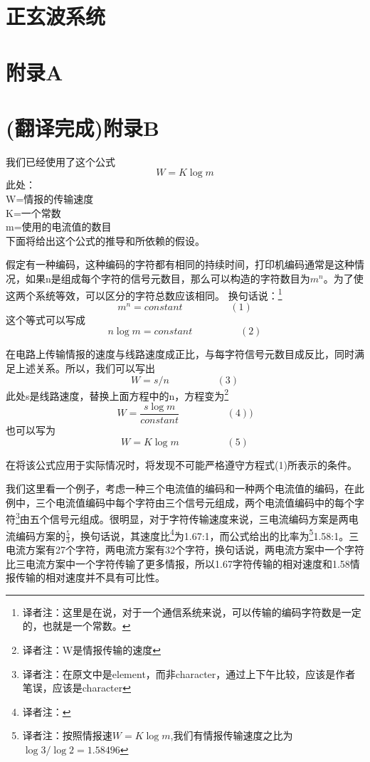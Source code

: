\documentclass{hfutpaper}
\begin{document}
\section{正玄波系统}

\appendix

\section{附录A}

\section{(翻译完成)附录B}
我们已经使用了这个公式
\[W=K \log{m} \]
此处：\\
W=情报的传输速度\\
K=一个常数\\
m=使用的电流值的数目\\

下面将给出这个公式的推导和所依赖的假设。
\par

假定有一种编码，这种编码的字符都有相同的持续时间，打印机编码通常是这种情况，如果n是组成每个字符的信号元数目，那么可以构造的字符数目为$m^n$。为了使这两个系统等效，可以区分的字符总数应该相同。 换句话说：\footnote{译者注：这里是在说，对于一个通信系统来说，可以传输的编码字符数是一定的，也就是一个常数。}
\[m^n=constant  \hspace{2cm}(1)\]
这个等式可以写成
\[n\log{m}=constant \hspace{2cm}(2)\]

在电路上传输情报的速度与线路速度成正比，与每字符信号元数目成反比，同时满足上述关系。所以，我们可以写出
\[W=s/n  \hspace{2cm}(3)\]
此处s是线路速度，替换上面方程中的n，方程变为\footnote{译者注：W是情报传输的速度}
\[W=\frac{s\log{m}}{constant}  \hspace{2cm}(4))\]
也可以写为
\[W=K\log{m}  \hspace{2cm}(5)\]
\par
在将该公式应用于实际情况时，将发现不可能严格遵守方程式(1)所表示的条件。\par
我们这里看一个例子，考虑一种三个电流值的编码和一种两个电流值的编码，在此例中，三个电流值编码中每个字符由三个信号元组成，两个电流值编码中的每个字符\footnote{译者注：在原文中是element，而非character，通过上下午比较，应该是作者笔误，应该是character}由五个信号元组成。很明显，对于字符传输速度来说，三电流编码方案是两电流编码方案的$\frac{5}{3}$，换句话说，其速度比\footnote{译者注：}为1.67:1，而公式给出的比率为\footnote{译者注：按照情报速$W=K\log{m}$,我们有情报传输速度之比为$\log{3}/\log{2}=1.58496$}1.58:1。三电流方案有27个字符，两电流方案有32个字符，换句话说，两电流方案中一个字符比三电流方案中一个字符传输了更多情报，所以1.67字符传输的相对速度和1.58情报传输的相对速度并不具有可比性。\par
\end{document}

